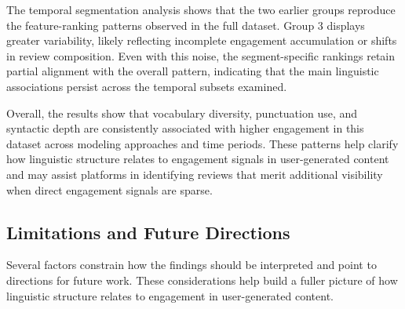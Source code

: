 \documentclass[12pt]{article}
\begin{document}
The temporal segmentation analysis shows that the two earlier groups reproduce the feature-ranking patterns observed in the full dataset. Group 3 displays greater variability, likely reflecting incomplete engagement accumulation or shifts in review composition. Even with this noise, the segment-specific rankings retain partial alignment with the overall pattern, indicating that the main linguistic associations persist across the temporal subsets examined.

Overall, the results show that vocabulary diversity, punctuation use, and syntactic depth are consistently associated with higher engagement in this dataset across modeling approaches and time periods. These patterns help clarify how linguistic structure relates to engagement signals in user-generated content and may assist platforms in identifying reviews that merit additional visibility when direct engagement signals are sparse.


\subsection{Limitations and Future Directions}

Several factors constrain how the findings should be interpreted and point to directions for future work. These considerations help build a fuller picture of how linguistic structure relates to engagement in user-generated content.
\end{document}
